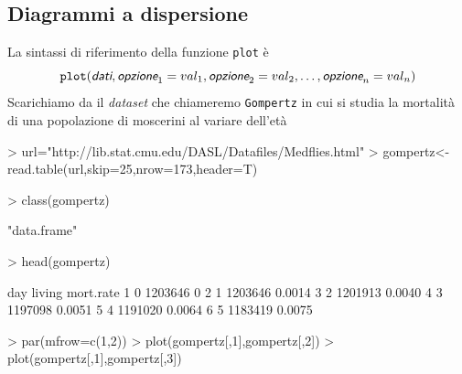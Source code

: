 \documentclass[onecolumn,11pt]{book}
\newcommand{\varia}[1]{\textsl{\textsf{#1}}}
\begin{document}
\subsection{Diagrammi a dispersione}
La sintassi di riferimento della funzione \texttt{plot}  \`e
\begin{equation*}
\texttt{plot}(\varia{dati},\varia{opzione}_1=val_1, \varia{opzione}_2=val_2,\ldots,\varia{opzione}_n=val_n)\end{equation*}
Scarichiamo da 
il \emph{dataset} che chiameremo \texttt{Gompertz} in cui si studia la mortalit\`a di una popolazione di moscerini al variare dell'et\`a 
\begin{Schunk}
\begin{Sinput}
> url="http://lib.stat.cmu.edu/DASL/Datafiles/Medflies.html"
> gompertz<-read.table(url,skip=25,nrow=173,header=T) 
\end{Sinput}
\end{Schunk}
\begin{Schunk}
\begin{Sinput}
> class(gompertz)
\end{Sinput}
\begin{Soutput}
[1] "data.frame"
\end{Soutput}
\begin{Sinput}
> head(gompertz)
\end{Sinput}
\begin{Soutput}
  day  living mort.rate
1   0 1203646         0
2   1 1203646    0.0014
3   2 1201913    0.0040
4   3 1197098    0.0051
5   4 1191020    0.0064
6   5 1183419    0.0075
\end{Soutput}
\begin{Sinput}
> par(mfrow=c(1,2))
> plot(gompertz[,1],gompertz[,2])
> plot(gompertz[,1],gompertz[,3])
\end{Sinput}
\end{Schunk}
 
\end{document}
